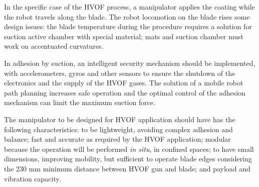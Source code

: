 In the specific case of the HVOF process, a manipulator applies the coating 
while the robot travels along the blade. The robot locomotion on the blade rises
some design issues: the blade temperature during the procedure requires a
solution for suction active chamber with special material; mats and suction
chamber must work on accentuated curvatures.



In adhesion by suction, an intelligent security mechanism should be implemented,
with accelerometers, gyros and other sensors to ensure the shutdown of the
electronics and the supply of the HVOF gases. The solution of a mobile robot
path planning increases safe operation and the optimal control of the adhesion
mechanism can limit the maximum suction force.


The manipulator to be designed for HVOF application should have has the
following characteristics: to be lightweight, avoiding complex adhesion and
balance; fast and accurate as required by the HVOF application; modular because
the operation will be performed \textit{in situ}, in confined spaces;
to have small dimensions, improving mobility, but sufficient to operate
blade edges considering the 230 mm minimum distance between HVOF gun and
blade; and payload and vibration capacity.


